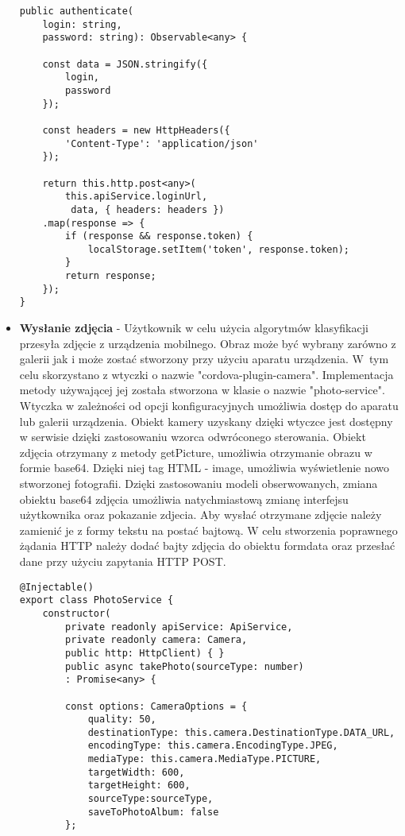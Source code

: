 \begin{itemize}
\begin{lstlisting}[caption=Metoda autoryzacji urządzenia mobilnego.]
public authenticate(
	login: string, 
	password: string): Observable<any> {
	
	const data = JSON.stringify({
		login,
		password
	});
	
	const headers = new HttpHeaders({ 
		'Content-Type': 'application/json' 
	});
	
	return this.http.post<any>(
		this.apiService.loginUrl,
		 data, { headers: headers })
	.map(response => {
		if (response && response.token) {
			localStorage.setItem('token', response.token);
		}
		return response;
	});
}
\end{lstlisting} 


\item \textbf{Wysłanie zdjęcia} - Użytkownik w celu użycia algorytmów klasyfikacji przesyła zdjęcie z urządzenia mobilnego. Obraz może być wybrany zarówno z galerii jak i może zostać stworzony przy użyciu aparatu urządzenia. W~tym celu skorzystano z wtyczki o nazwie "cordova-plugin-camera". Implementacja metody używającej jej została stworzona w klasie o nazwie "photo-service". Wtyczka w zależności od opcji konfiguracyjnych umożliwia dostęp do aparatu lub galerii urządzenia. Obiekt kamery uzyskany dzięki wtyczce jest dostępny w serwisie dzięki zastosowaniu wzorca odwróconego sterowania. Obiekt zdjęcia otrzymany z metody getPicture, umożliwia otrzymanie obrazu w formie base64. Dzięki niej tag HTML - image, umożliwia wyświetlenie nowo stworzonej fotografii. Dzięki zastosowaniu modeli obserwowanych, zmiana obiektu base64 zdjęcia umożliwia natychmiastową zmianę interfejsu użytkownika oraz pokazanie zdjecia. Aby wysłać otrzymane zdjęcie należy zamienić je z formy tekstu na postać bajtową. W celu stworzenia poprawnego żądania HTTP należy dodać bajty zdjęcia do obiektu formdata oraz przesłać dane przy użyciu zapytania HTTP POST.



\begin{lstlisting}[caption=Wykorzystanie wtyczki w celu prezentacji zdjecia.]
@Injectable()
export class PhotoService {
	constructor(
		private readonly apiService: ApiService,
		private readonly camera: Camera,
		public http: HttpClient) { }	
		public async takePhoto(sourceType: number)
		: Promise<any> {
	
		const options: CameraOptions = {
			quality: 50,
			destinationType: this.camera.DestinationType.DATA_URL,
			encodingType: this.camera.EncodingType.JPEG,
			mediaType: this.camera.MediaType.PICTURE,
			targetWidth: 600,
			targetHeight: 600,
			sourceType:sourceType,
			saveToPhotoAlbum: false
		};		
		

\end{lstlisting}
\end{itemize}

